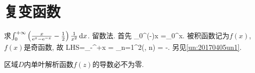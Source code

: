 \chapter{复变函数}
求$\int_0^{+\infty}\left(\frac{x}{\mathrm{e}^x-\mathrm{e}^{-x}}-\frac12\right)\frac1{x^2}\,\mathrm{d} x$.
\eq
\ba
留数法. 首先
\bee
\int_0^{\infty}\left(-\right)\ud x
  =\int_0^{\infty}\ud x.
\eee
被积函数记为$f(x)$, $f(x)$是奇函数, 故
\bee
LHS=\int_{-\infty}^{+\infty}\ud x
  = \sum_{n=1}^{\infty}2\pi\ui\Res\left(, \ui n\pi\right)
  = -.
\eee
另见\ref{un:20170405un1}.
\ea

\bq{}{}
区域$D$内单叶解析函数$f(z)$的导数必不为零.
\eq
